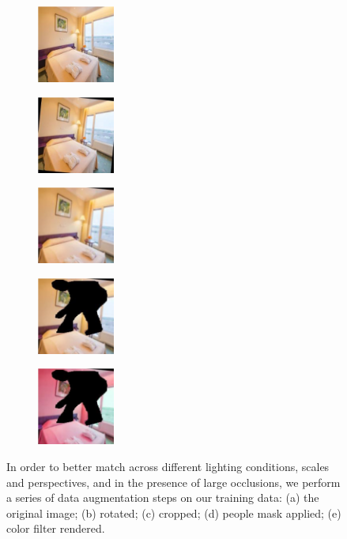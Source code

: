 \documentclass[letterpaper]{article} %
\begin{document}
\begin{figure}
\centering
   \begin{subfigure}[b]{1.2in}
        \centering
        \includegraphics[height=1in]{figures/data_augmentation/1.png}
        \caption{}
    \end{subfigure}
   \begin{subfigure}[b]{1.2in}
        \centering
        \includegraphics[height=1in]{figures/data_augmentation/2.png}
        \caption{}
    \end{subfigure}
    \begin{subfigure}[b]{1.2in}
        \centering
        \includegraphics[height=1in]{figures/data_augmentation/3.png}
        \caption{}
    \end{subfigure}
    \begin{subfigure}[b]{1.2in}
        \centering
        \includegraphics[height=1in]{figures/data_augmentation/4.png}
        \caption{}
    \end{subfigure}
    \begin{subfigure}[b]{1.2in}
        \centering
        \includegraphics[height=1in]{figures/data_augmentation/5.png}
        \caption{}
    \end{subfigure}
    \caption[Data augmentation to mimic properties of query images.]{In order to better match across different lighting conditions, scales and perspectives, and in the presence of large occlusions, we perform a series of data augmentation steps on our training data: (a) the original image; (b) rotated; (c) cropped; (d) people mask applied; (e) color filter rendered.}
    \label{fig:data_augmentation}
\end{figure}
\end{document}
